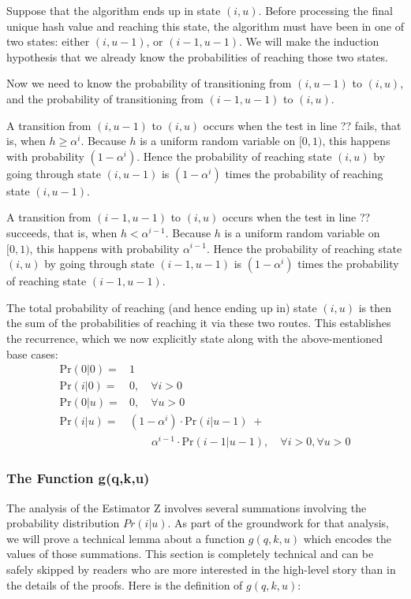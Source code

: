 \documentclass{sig-alternate}
\begin{document}
Suppose that the algorithm ends up in state $(i, u)$. Before processing the final
unique hash value and reaching this state, the algorithm must have been in one of 
two states: either $(i, u-1)$, or $(i-1, u-1)$. We will make the
induction hypothesis that we already know the probabilities of reaching those two states.

Now we need to know the probability of transitioning from 
$(i, u-1)$ to $(i, u)$, and the probability of transitioning from 
$(i-1, u-1)$ to $(i, u)$.

A transition from $(i, u-1)$ to $(i, u)$ occurs when the test in line ??
fails, that is, when $h \geq \alpha^i$.
Because $h$ is a uniform random variable on $[0,1)$, this happens
with probability $(1 - \alpha^i)$. Hence the probability of reaching state $(i,u)$ 
by going through state $(i, u-1)$ is $(1 - \alpha^i)$ times 
the probability of reaching state $(i,u-1)$.

A transition from $(i-1, u-1)$ to $(i, u)$ occurs when the test in line ??
succeeds, that is, when $h < \alpha^{i-1}$.
Because $h$ is a uniform random variable on $[0,1)$, this happens
with probability $\alpha^{i-1}$.
Hence the probability of reaching state $(i,u)$ 
by going through state $(i-1, u-1)$ is $(1 - \alpha^i)$ times 
the probability of reaching state $(i-1,u-1)$.

The total probability of reaching (and hence ending up in) state $(i,u)$ is then 
the sum of the probabilities of reaching it via these two routes. 
This establishes the recurrence, which we now explicitly state
along with the above-mentioned base cases:
\begin{align}
\mathrm{Pr}(0 | 0) = & 1 \\
\mathrm{Pr}(i | 0) = & 0, \quad \forall i > 0 \\
\mathrm{Pr}(0 | u) = & 0, \quad \forall u > 0 \\
\mathrm{Pr}(i | u) = & (1 - \alpha^i) \cdot \mathrm{Pr}(i | u\!-\!1) \; + \\
 & \quad \quad  \alpha^{i\!-\!1} \cdot \mathrm{Pr}(i\!-\!1 | u\!-\!1), \quad \forall i\!>\!0, \forall u\!>\!0
\end{align}

\subsubsection{The Function g(q,k,u)}

The analysis of the Estimator Z involves several summations involving
the probability distribution $Pr(i|u)$. As part of the groundwork for
that analysis, we will prove a technical lemma about a function
$g(q,k,u)$ which encodes the values of those summations.  This section
is completely technical and can be safely skipped by readers who are
more interested in the high-level story than in the details of the proofs.
Here is the definition of $g(q,k,u)$:
\end{document}
